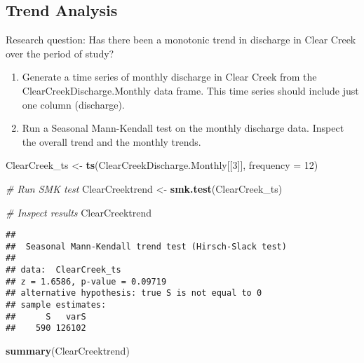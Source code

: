 \documentclass[]{article}
\newenvironment{Shaded}{\begin{snugshade}}{\end{snugshade}}
\newcommand{\CommentTok}[1]{\textcolor[rgb]{0.56,0.35,0.01}{\textit{#1}}}
\newcommand{\DataTypeTok}[1]{\textcolor[rgb]{0.13,0.29,0.53}{#1}}
\newcommand{\DecValTok}[1]{\textcolor[rgb]{0.00,0.00,0.81}{#1}}
\newcommand{\KeywordTok}[1]{\textcolor[rgb]{0.13,0.29,0.53}{\textbf{#1}}}
\newcommand{\NormalTok}[1]{#1}
\newcommand{\StringTok}[1]{\textcolor[rgb]{0.31,0.60,0.02}{#1}}
\providecommand{\tightlist}{%
  \setlength{\itemsep}{0pt}\setlength{\parskip}{0pt}}
\begin{document}
\hypertarget{trend-analysis}{%
\subsection{Trend Analysis}\label{trend-analysis}}

Research question: Has there been a monotonic trend in discharge in
Clear Creek over the period of study?

\begin{enumerate}
\def\labelenumi{\arabic{enumi}.}
\setcounter{enumi}{10}
\tightlist
\item
  Generate a time series of monthly discharge in Clear Creek from the
  ClearCreekDischarge.Monthly data frame. This time series should
  include just one column (discharge).
\item
  Run a Seasonal Mann-Kendall test on the monthly discharge data.
  Inspect the overall trend and the monthly trends.
\end{enumerate}

\begin{Shaded}
\begin{Highlighting}[]
\NormalTok{ClearCreek_ts <-}\StringTok{ }\KeywordTok{ts}\NormalTok{(ClearCreekDischarge.Monthly[[}\DecValTok{3}\NormalTok{]], }\DataTypeTok{frequency =} \DecValTok{12}\NormalTok{)}

\CommentTok{# Run SMK test}
\NormalTok{ClearCreektrend <-}\StringTok{ }\KeywordTok{smk.test}\NormalTok{(ClearCreek_ts)}

\CommentTok{# Inspect results}
\NormalTok{ClearCreektrend}
\end{Highlighting}
\end{Shaded}

\begin{verbatim}
## 
##  Seasonal Mann-Kendall trend test (Hirsch-Slack test)
## 
## data:  ClearCreek_ts
## z = 1.6586, p-value = 0.09719
## alternative hypothesis: true S is not equal to 0
## sample estimates:
##      S   varS 
##    590 126102
\end{verbatim}

\begin{Shaded}
\begin{Highlighting}[]
\KeywordTok{summary}\NormalTok{(ClearCreektrend)}
\end{Highlighting}
\end{Shaded}
\end{document}
